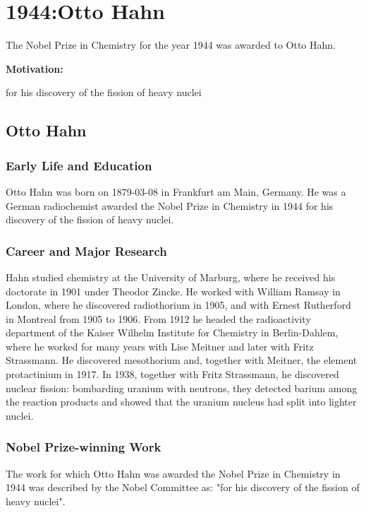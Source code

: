\chapter{1944:Otto Hahn}

\label{chap:chemistry1944}

The Nobel Prize in Chemistry for the year 1944 was awarded to Otto Hahn.

\textbf{Motivation:}

for his discovery of the fission of heavy nuclei

\section{Otto Hahn}

\subsection*{Early Life and Education}

Otto Hahn was born on 1879-03-08 in Frankfurt am Main, Germany.
He was a German radiochemist awarded the Nobel Prize in Chemistry in 1944 for his discovery of the fission of heavy nuclei.

\subsection*{Career and Major Research}

Hahn studied chemistry at the University of Marburg, where he received his doctorate in 1901 under Theodor Zincke.
He worked with William Ramsay in London, where he discovered radiothorium in 1905, and with Ernest Rutherford in Montreal from 1905 to 1906.
From 1912 he headed the radioactivity department of the Kaiser Wilhelm Institute for Chemistry in Berlin-Dahlem, where he worked for many years with Lise Meitner and later with Fritz Strassmann.
He discovered mesothorium and, together with Meitner, the element protactinium in 1917.
In 1938, together with Fritz Strassmann, he discovered nuclear fission: bombarding uranium with neutrons, they detected barium among the reaction products and showed that the uranium nucleus had split into lighter nuclei.

\subsection*{Nobel Prize-winning Work}

The work for which Otto Hahn was awarded the Nobel Prize in Chemistry in 1944 was described by the Nobel Committee as: "for his discovery of the fission of heavy nuclei".

